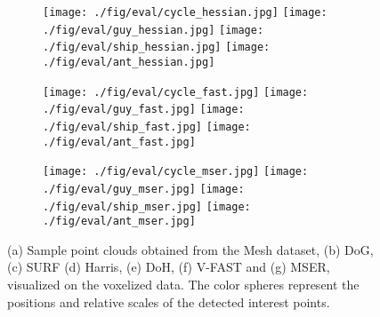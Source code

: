 \begin{figure}[ht]
\begin{subfigure}[t]{1\linewidth}
		\label{fig/eval/mesh/hessian}	
		\makebox[0.15\linewidth]{\raisebox{0.07\linewidth}{(e) DoH}} 
		\texttt{[image: ./fig/eval/cycle\_hessian.jpg]} 
		\texttt{[image: ./fig/eval/guy\_hessian.jpg]} 
		\texttt{[image: ./fig/eval/ship\_hessian.jpg]}
		\texttt{[image: ./fig/eval/ant\_hessian.jpg]} 
	\end{subfigure}
	\begin{subfigure}[t]{1\linewidth} \centering 
		\label{fig/eval/mesh/fast}	
		\makebox[0.15\linewidth]{\raisebox{0.07\linewidth}{(f) VFAST}} 
		\texttt{[image: ./fig/eval/cycle\_fast.jpg]} 
		\texttt{[image: ./fig/eval/guy\_fast.jpg]} 
		\texttt{[image: ./fig/eval/ship\_fast.jpg]}
		\texttt{[image: ./fig/eval/ant\_fast.jpg]} 
	\end{subfigure}
	\begin{subfigure}[t]{1\linewidth} \centering 
		\label{fig/eval/mesh/mser}	
		\makebox[0.15\linewidth]{\raisebox{0.07\linewidth}{(g) MSER}} 
		\texttt{[image: ./fig/eval/cycle\_mser.jpg]} 
		\texttt{[image: ./fig/eval/guy\_mser.jpg]} 
		\texttt{[image: ./fig/eval/ship\_mser.jpg]}
		\texttt{[image: ./fig/eval/ant\_mser.jpg]} 
	\end{subfigure}
	\caption{(a) Sample point clouds obtained from the Mesh dataset, (b) DoG, (c) SURF (d) Harris, (e) DoH, (f) V-FAST and (g) MSER, visualized on the voxelized data. The color spheres represent the positions and relative scales of the detected interest points.}
	\label{fig/eval/mesh}
\end{figure}

